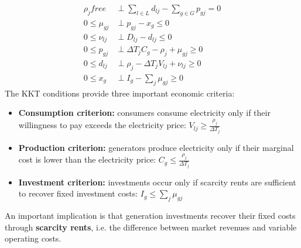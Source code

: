 \documentclass[12pt, openany]{report}
\theoremstyle{definition}
\begin{document}
\begin{equation}
    \begin{aligned}
        \rho_j free &\perp \sum_{l\in L} d_{lj} - \sum_{g\in G} p_{gj} = 0\\
        0 \leq \mu_{gj} &\perp p_{gj} - x_g \leq 0\\
        0 \leq \nu_{lj} &\perp D_{lj} - d_{lj} \leq 0\\
        0 \leq p_{gj} &\perp \Delta T_jC_g - \rho_j + \mu_{gj} \geq 0\\
        0 \leq d_{lj} &\perp \rho_j - \Delta T_j V_{lj} + \nu_{lj} \geq 0\\
        0 \leq x_g &\perp I_g - \sum_j \mu_{gj} \geq 0 
    \end{aligned}
\end{equation}
The KKT conditions provide three important economic criteria:
\begin{itemize}
    \item \textbf{Consumption criterion:} consumers consume electricity only if their willingness to pay exceeds the electricity price: $V_{lj}\ge\frac{\rho_j}{\Delta T_j}$
    \item \textbf{Production criterion:} generators produce electricity only if their marginal cost is lower than the electricity price: $C_g\le\frac{\rho_j}{\Delta T_j}$
    \item \textbf{Investment criterion:} investments occur only if scarcity rents are sufficient to recover fixed investment costs: $I_g\le\sum_j\mu_{gj}$
\end{itemize}
An important implication is that generation investments recover their fixed costs through \textbf{scarcity rents}, i.e. the difference between market revenues and variable operating costs.
\end{document}
